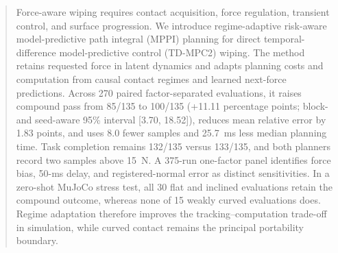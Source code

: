 \begin{abstract}
Force-aware wiping requires contact acquisition, force regulation, transient
control, and surface progression. We introduce regime-adaptive risk-aware
model-predictive path integral (MPPI) planning for direct temporal-difference
model-predictive control (TD-MPC2) wiping. The method retains requested force
in latent dynamics and adapts planning costs and computation from causal
contact regimes and learned next-force predictions. Across 270 paired
factor-separated evaluations, it raises compound pass from 85/135 to 100/135
(+11.11 percentage points; block- and seed-aware 95\% interval [3.70, 18.52]),
reduces mean relative error by 1.83 points, and uses 8.0 fewer samples and
25.7~ms less median planning time. Task completion remains 132/135 versus
133/135, and both planners record two samples above 15~N. A 375-run one-factor
panel identifies force bias, 50-ms delay, and registered-normal error as
distinct sensitivities. In a zero-shot MuJoCo stress test, all 30 flat and
inclined evaluations retain the compound outcome, whereas none of 15 weakly
curved evaluations does. Regime adaptation therefore improves the
tracking--computation trade-off in simulation, while curved contact remains
the principal portability boundary.
\end{abstract}

